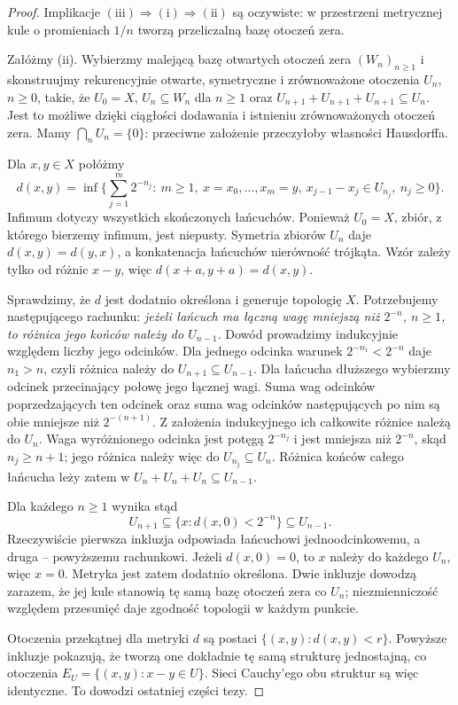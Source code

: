 \documentclass[11pt,a4paper]{article}
\numberwithin{equation}{section}
\theoremstyle{plain}
\theoremstyle{definition}
\theoremstyle{remark}
\begin{document}
\begin{proof}
Implikacje $(\mathrm{iii})\Rightarrow(\mathrm{i})\Rightarrow(\mathrm{ii})$ są oczywiste:
w przestrzeni metrycznej kule o promieniach $1/n$
tworzą przeliczalną bazę otoczeń zera.

Załóżmy (ii). Wybierzmy malejącą bazę otwartych otoczeń
zera $(W_n)_{n\ge1}$ i skonstruujmy rekurencyjnie
otwarte, symetryczne i zrównoważone otoczenia $U_n$,
$n\ge0$, takie, że
$U_0=X$, $U_n\subseteq W_n$ dla $n\ge1$ oraz
$U_{n+1}+U_{n+1}+U_{n+1}\subseteq U_n$.
Jest to możliwe dzięki ciągłości dodawania i istnieniu
zrównoważonych otoczeń zera. Mamy $\bigcap_nU_n=\{0\}$:
przeciwne założenie przeczyłoby własności Hausdorffa.

Dla $x,y\in X$ połóżmy
\[
 d(x,y)=\inf\Big\{\sum_{j=1}^{m}2^{-n_j}:\
 m\ge1,\ x=x_0,\ldots,x_m=y,\
 x_{j-1}-x_j\in U_{n_j},\ n_j\ge0\Big\}.
\]
Infimum dotyczy wszystkich skończonych łańcuchów.
Ponieważ $U_0=X$, zbiór, z którego bierzemy infimum,
jest niepusty. Symetria zbiorów $U_n$ daje
$d(x,y)=d(y,x)$, a konkatenacja łańcuchów nierówność
trójkąta. Wzór zależy tylko od różnic $x-y$, więc
$d(x+a,y+a)=d(x,y)$.

Sprawdzimy, że $d$ jest dodatnio określona i generuje
topologię $X$. Potrzebujemy następującego rachunku:
\emph{jeżeli łańcuch ma łączną wagę mniejszą niż $2^{-n}$,
$n\ge1$, to różnica jego końców należy do $U_{n-1}$.}
Dowód prowadzimy indukcyjnie względem liczby jego
odcinków. Dla jednego odcinka warunek
$2^{-n_1}<2^{-n}$ daje $n_1>n$, czyli różnica należy do
$U_{n+1}\subseteq U_{n-1}$. Dla łańcucha dłuższego
wybierzmy odcinek przecinający połowę jego łącznej
wagi. Suma wag odcinków poprzedzających ten odcinek
oraz suma wag odcinków następujących po nim są
obie mniejsze niż $2^{-(n+1)}$. Z założenia
indukcyjnego ich całkowite różnice należą do $U_n$.
Waga wyróżnionego odcinka jest potęgą $2^{-n_j}$
i jest mniejsza niż $2^{-n}$, skąd $n_j\geq n+1$;
jego różnica należy więc do $U_{n_j}\subseteq U_n$.
Różnica końców całego łańcucha leży zatem w
$U_n+U_n+U_n\subseteq U_{n-1}$.

Dla każdego $n\ge1$ wynika stąd
\[
 U_{n+1}\subseteq\{x:d(x,0)<2^{-n}\}\subseteq U_{n-1}.
\]
Rzeczywiście pierwsza inkluzja odpowiada łańcuchowi
jednoodcinkowemu, a druga -- powyższemu rachunkowi.
Jeżeli $d(x,0)=0$, to $x$ należy do każdego $U_n$,
więc $x=0$. Metryka jest zatem dodatnio określona.
Dwie inkluzje dowodzą zarazem, że jej kule stanowią
tę samą bazę otoczeń zera co $U_n$; niezmienniczość
względem przesunięć daje zgodność topologii w każdym punkcie.

Otoczenia przekątnej dla metryki $d$ są postaci
$\{(x,y):d(x,y)<r\}$. Powyższe inkluzje pokazują,
że tworzą one dokładnie tę samą strukturę jednostajną,
co otoczenia $E_U=\{(x,y):x-y\in U\}$.
Sieci Cauchy'ego obu struktur są więc identyczne.
To dowodzi ostatniej części tezy.
\end{proof}
\end{document}
